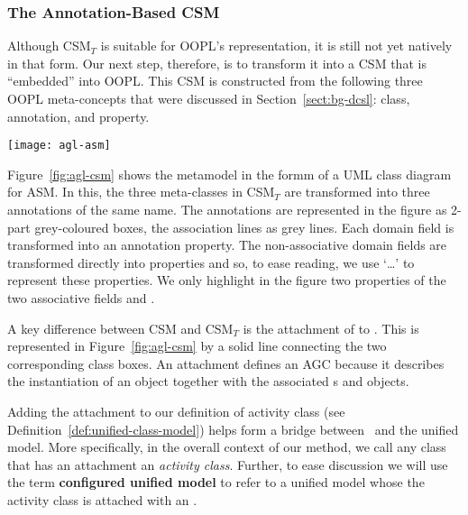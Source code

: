 \subsubsection{The Annotation-Based CSM}
\label{sect:agl-csm}

Although CSM$_T$ is suitable for OOPL's representation, it is still not yet natively in that form. Our next step, therefore, is to transform it into a CSM that is ``embedded'' into OOPL. This CSM is constructed from the following three OOPL meta-concepts that were discussed in Section~\ref{sect:bg-dcsl}: class, annotation, and property.

\begin{figure*}[ht]
	\begin{center}
		\texttt{[image: agl-asm]}
	\end{center}
	\caption{The concrete syntax model (CSM) of \agl.} %
	\label{fig:agl-csm}
\end{figure*}

Figure~\ref{fig:agl-csm} shows the metamodel in the formm of a UML class diagram for ASM. In this, the three meta-classes in CSM$_T$ are transformed into three annotations of the same name. The annotations are represented in the figure as 2-part grey-coloured boxes, the association lines as grey lines. Each domain field is transformed into an annotation property. The non-associative domain fields are transformed directly into properties and so, to ease reading, we use `\dots' to represent these properties. We only highlight in the figure two properties of the two associative fields  and . 

A key difference between CSM and CSM$_T$ is the attachment of  to . This is represented in Figure~\ref{fig:agl-csm} by a solid line connecting the two corresponding class boxes. An  attachment defines an AGC because it describes the instantiation of an  object together with the associated s and  objects.

Adding the  attachment to our definition of activity class (see Definition~\ref{def:unified-class-model}) helps form a bridge between \agl~and the unified model. More specifically, in the overall context of our method, we call any class that has an  attachment an \textit{activity class}.
Further, to ease discussion we will use the term \textbf{configured unified model} to refer to a unified model whose the activity class is attached with an . 
%

